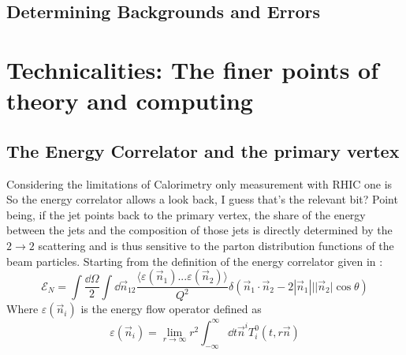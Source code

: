 \chapter{Determining Backgrounds and Errors}
%	
\part{Technicalities: The finer points of theory and computing}
\chapter{The Energy Correlator and the primary vertex}
	\label{ch:ENC_th}
	Considering the limitations of Calorimetry only measurement with RHIC one is 
So the energy correlator allows a look back, I guess that's the relevant bit? 
	Point being, if the jet points back to the primary vertex, the share of the energy between the jets and the composition of those jets is directly determined by the $2 \rightarrow 2$ scattering and is thus sensitive to the parton distribution functions of the beam particles. 
	Starting from the definition of the energy correlator given in \cite{Larkoski2013}:
	\begin{equation}
		\mathcal{E}_{N} = \int \frac{\dd \Omega}{2} \int \dd \vec{n}_{12} \frac{\langle \varepsilon \left( \vec{n}_1 \right) ... \varepsilon \left(\vec{n}_2 \right)\rangle}{Q^2} \delta\left( \vec{n}_1 \cdot \vec{n}_2 - 2|\vec{n}_1|||\vec{n}_2|\cos  \theta \right)
		\label{eq:ENC}
	\end{equation}
	Where $\varepsilon \left( \vec{n}_i \right)$ is the energy flow operator defined as 
	\begin{equation}
		\varepsilon \left( \vec{n}_i \right) = \lim_{r\rightarrow \infty} r^2 \int_{-\infty}^\infty \dd t \vec{n}^i T^0_{i}\left( t, r \vec{n} \right) 
		\label{eq:enrgy_flow_op}
	\end{equation}
